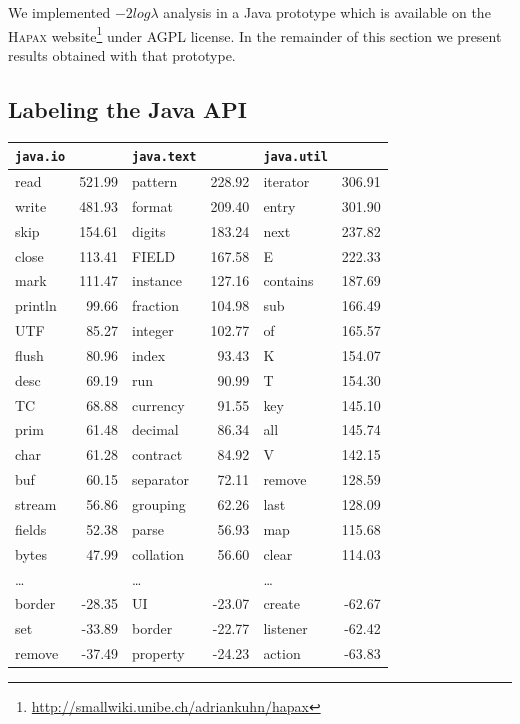 \documentclass[10pt]{book}
\begin{document}
\noindent We implemented $-2log\lambda$ analysis in a Java prototype which is available on the \textsc{Hapax} website\footnote{\url{http://smallwiki.unibe.ch/adriankuhn/hapax}} under AGPL license. In the remainder of this section we present results obtained with that prototype.

\subsection{Labeling the Java API}\label{example1}

\begin{table}
{\scriptsize \begin{center}
\begin{tabular}{lr | lr | lr}
\verb$java.io$ & ~ & \verb$java.text$ & ~ &  \verb$java.util$ & ~ \\
\hline
read & 521.99 & pattern & 228.92 & iterator & 306.91\\
write & 481.93 & format & 209.40 & entry & 301.90\\
skip & 154.61 & digits & 183.24 & next & 237.82\\
close & 113.41 & FIELD & 167.58 & E & 222.33\\
mark & 111.47 & instance & 127.16 & contains & 187.69\\
println & 99.66 & fraction & 104.98 & sub & 166.49\\
UTF & 85.27 & integer & 102.77 & of & 165.57\\
flush & 80.96 & index & 93.43 & K & 154.07\\
desc & 69.19 & run & 90.99 & T & 154.30\\
TC & 68.88 & currency & 91.55 & key & 145.10\\
prim & 61.48 & decimal & 86.34 & all & 145.74\\
char & 61.28 & contract & 84.92 & V & 142.15\\
buf & 60.15 & separator & 72.11 & remove & 128.59\\
stream & 56.86 & grouping & 62.26 & last & 128.09\\
fields & 52.38 & parse & 56.93 & map & 115.68\\
bytes & 47.99 & collation & 56.60 & clear & 114.03\\
\dots & ~ & \dots & ~ & \dots & ~ \\
border & -28.35 & UI & -23.07 & create & -62.67\\
set & -33.89 & border & -22.77 & listener & -62.42\\
remove & -37.49 & property & -24.23 & action & -63.83\\

\end{tabular}
\end{center}}
\end{table}
\end{document}
